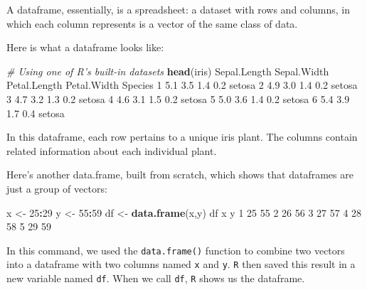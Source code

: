 \documentclass[
]{book}
\newenvironment{Shaded}{\begin{snugshade}}{\end{snugshade}}
\newcommand{\CommentTok}[1]{\textcolor[rgb]{0.56,0.35,0.01}{\textit{#1}}}
\newcommand{\DecValTok}[1]{\textcolor[rgb]{0.00,0.00,0.81}{#1}}
\newcommand{\FloatTok}[1]{\textcolor[rgb]{0.00,0.00,0.81}{#1}}
\newcommand{\KeywordTok}[1]{\textcolor[rgb]{0.13,0.29,0.53}{\textbf{#1}}}
\newcommand{\NormalTok}[1]{#1}
\newcommand{\OperatorTok}[1]{\textcolor[rgb]{0.81,0.36,0.00}{\textbf{#1}}}
\newcommand{\StringTok}[1]{\textcolor[rgb]{0.31,0.60,0.02}{#1}}
\begin{document}
A dataframe, essentially, is a spreadsheet: a dataset with rows and columns, in which each column represents is a vector of the same class of data.

Here is what a dataframe looks like:

\begin{Shaded}
\begin{Highlighting}[]
\CommentTok{# Using one of R's built-in datasets}
\KeywordTok{head}\NormalTok{(iris)}
\NormalTok{  Sepal.Length Sepal.Width Petal.Length Petal.Width Species}
\DecValTok{1}          \FloatTok{5.1}         \FloatTok{3.5}          \FloatTok{1.4}         \FloatTok{0.2}\NormalTok{  setosa}
\DecValTok{2}          \FloatTok{4.9}         \FloatTok{3.0}          \FloatTok{1.4}         \FloatTok{0.2}\NormalTok{  setosa}
\DecValTok{3}          \FloatTok{4.7}         \FloatTok{3.2}          \FloatTok{1.3}         \FloatTok{0.2}\NormalTok{  setosa}
\DecValTok{4}          \FloatTok{4.6}         \FloatTok{3.1}          \FloatTok{1.5}         \FloatTok{0.2}\NormalTok{  setosa}
\DecValTok{5}          \FloatTok{5.0}         \FloatTok{3.6}          \FloatTok{1.4}         \FloatTok{0.2}\NormalTok{  setosa}
\DecValTok{6}          \FloatTok{5.4}         \FloatTok{3.9}          \FloatTok{1.7}         \FloatTok{0.4}\NormalTok{  setosa}
\end{Highlighting}
\end{Shaded}

In this dataframe, each row pertains to a unique iris plant. The columns contain related information about each individual plant.

Here's another data.frame, built from scratch, which shows that dataframes are just a group of vectors:

\begin{Shaded}
\begin{Highlighting}[]
\NormalTok{x <-}\StringTok{ }\DecValTok{25}\OperatorTok{:}\DecValTok{29}
\NormalTok{y <-}\StringTok{ }\DecValTok{55}\OperatorTok{:}\DecValTok{59}
\NormalTok{df <-}\StringTok{ }\KeywordTok{data.frame}\NormalTok{(x,y)}
\NormalTok{df}
\NormalTok{   x  y}
\DecValTok{1} \DecValTok{25} \DecValTok{55}
\DecValTok{2} \DecValTok{26} \DecValTok{56}
\DecValTok{3} \DecValTok{27} \DecValTok{57}
\DecValTok{4} \DecValTok{28} \DecValTok{58}
\DecValTok{5} \DecValTok{29} \DecValTok{59}
\end{Highlighting}
\end{Shaded}

In this command, we used the \texttt{data.frame()} function to combine two vectors into a dataframe with two columns named \texttt{x} and \texttt{y}. \texttt{R} then saved this result in a new variable named \texttt{df}. When we call \texttt{df}, \texttt{R} shows us the dataframe.
\end{document}
